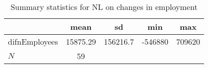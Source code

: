 \begin{table}[htbp]\centering
\def\sym#1{\ifmmode^{#1}\else\(^{#1}\)\fi}
\caption{Summary statistics for NL on changes in employment}
\begin{tabular}{l*{1}{cccc}}
\hline\hline
            &        mean&          sd&         min&         max\\
\hline
difnEmployees&    15875.29&    156216.7&     -546880&      709620\\
\hline
\(N\)       &          59&            &            &            \\
\hline\hline
\end{tabular}
\end{table}
